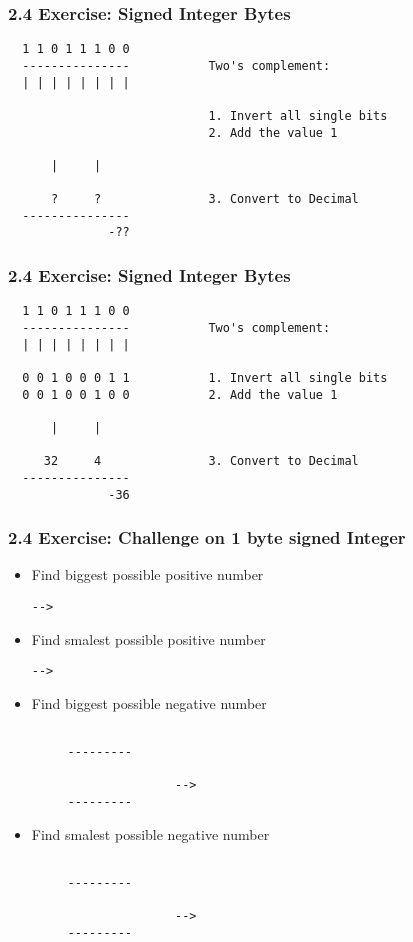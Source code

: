 \begin{frame}[fragile]
  \frametitle{2.4 Exercise: Signed Integer Bytes}
  \begin{verbatim}
  1 1 0 1 1 1 0 0
  ---------------           Two's complement:
  | | | | | | | |

                            1. Invert all single bits
                            2. Add the value 1
    
      |     |

      ?     ?               3. Convert to Decimal
  ---------------
              -??
  \end{verbatim}
\end{frame}


\begin{frame}[fragile]
  \frametitle{2.4 Exercise: Signed Integer Bytes}
  \begin{verbatim}
  1 1 0 1 1 1 0 0
  ---------------           Two's complement:
  | | | | | | | |

  0 0 1 0 0 0 1 1           1. Invert all single bits
  0 0 1 0 0 1 0 0           2. Add the value 1
    
      |     |

     32     4               3. Convert to Decimal
  ---------------
              -36
  \end{verbatim}
\end{frame}


\begin{frame}[fragile]
  \frametitle{2.4 Exercise: Challenge on 1 byte signed Integer}
    \begin{itemize}
        \item Find biggest possible positive number
  \begin{lstlisting}[basicstyle=\tiny]
             		-->  
  \end{lstlisting}
        \item Find smalest possible positive number
  \begin{lstlisting}[basicstyle=\tiny]
              		-->  
  \end{lstlisting}
        \item Find biggest possible negative number
  \begin{lstlisting}[basicstyle=\tiny]
     	
     ---------	
     
              		-->  
     ---------	
  \end{lstlisting}
        \item Find smalest possible negative number
  \begin{lstlisting}[basicstyle=\tiny]
     
     ---------
              
              		--> 
     ---------
  \end{lstlisting}
    \end{itemize}
\end{frame}


